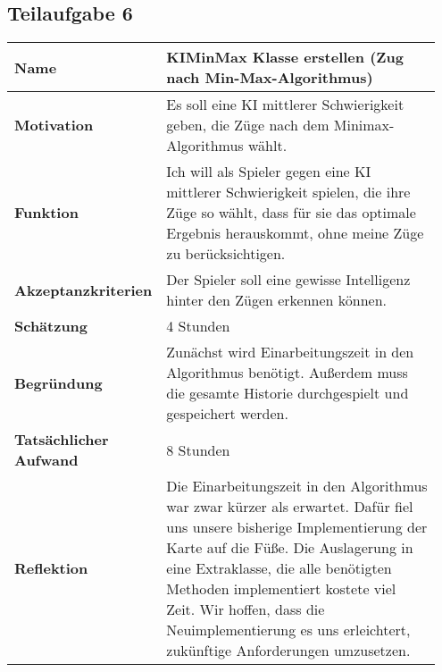 \documentclass[a4paper,10pt]{article}
\begin{document}
\subsection*{}
\subsection*{Teilaufgabe 6}
\begin{tabular}{|p{0.25\linewidth}|p{0.7\linewidth}|}
\hline
 \textbf{Name} & KIMinMax Klasse erstellen (Zug nach Min-Max-Algorithmus) \\
 \hline
 \textbf{Motivation} & Es soll eine KI mittlerer Schwierigkeit geben, die Züge nach dem Minimax-Algorithmus wählt.\\
 \hline
 \textbf{Funktion} & Ich will als Spieler gegen eine KI mittlerer Schwierigkeit spielen, die ihre Züge so wählt, dass für sie das optimale Ergebnis herauskommt, ohne meine Züge zu berücksichtigen.\\
 \hline
 \textbf{Akzeptanzkriterien} & Der Spieler soll eine gewisse Intelligenz hinter den Zügen erkennen können.\\
 \hline
 \textbf{Schätzung} & 4 Stunden\\
 \hline
 \textbf{Begründung} & Zunächst wird Einarbeitungszeit in den Algorithmus benötigt. Außerdem muss die gesamte Historie durchgespielt und gespeichert werden.\\
 \hline
 \textbf{Tatsächlicher Aufwand} & 8 Stunden\\
 \hline
 \textbf{Reflektion} & Die Einarbeitungszeit in den Algorithmus war zwar kürzer als erwartet. Dafür fiel uns unsere bisherige Implementierung der Karte auf die Füße. Die Auslagerung in eine Extraklasse, die alle benötigten Methoden implementiert kostete viel Zeit. Wir hoffen, dass die Neuimplementierung es uns erleichtert, zukünftige Anforderungen umzusetzen. \\
 \hline
\end{tabular}
\end{document}
